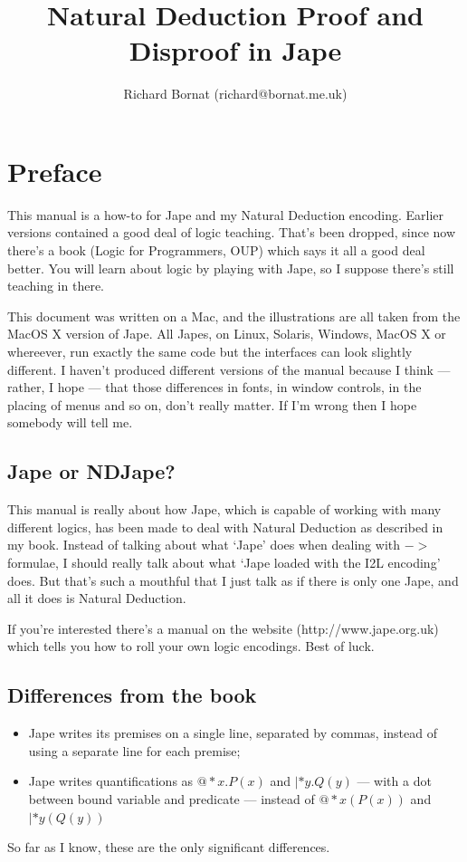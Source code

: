 \documentclass[11pt]{book}
\title{\huge Natural Deduction Proof and Disproof in Jape}
\author{Richard Bornat (richard@bornat.me.uk)}
\begin{document}
\maketitle


\chapter*{Preface}

This manual is a how-to for Jape and my Natural Deduction encoding. Earlier versions contained a good deal of logic teaching. That's been dropped, since now there's a book (Logic for Programmers, OUP) which says it all a good deal better. You will learn about logic by playing with Jape, so I suppose there's still teaching in there.

This document was written on a Mac, and the illustrations are all taken from the MacOS X version of Jape. All Japes, on Linux, Solaris, Windows, MacOS X or whereever, run exactly the same code but the interfaces can look slightly different. I haven't produced different versions of the manual because I think --- rather, I hope --- that those differences in fonts, in window controls, in the placing of menus and so on, don't really matter. If I'm wrong then I hope somebody will tell me.

\section*{Jape or NDJape?}

This manual is really about how Jape, which is capable of working with many different logics, has been made to deal with Natural Deduction as described in my book. Instead of talking about what `Jape' does when dealing with $->$ formulae, I should really talk about what `Jape loaded with the I2L encoding' does. But that's such a mouthful that I just talk as if there is only one Jape, and all it does is Natural Deduction.

If you're interested there's a manual on the website (http://www.jape.org.uk) which tells you how to roll your own logic encodings. Best of luck.

\section*{Differences from the book}
\begin{itemize}
\item Jape writes its premises on a single line, separated by commas, instead of using a separate line for each premise;
\item Jape writes quantifications as $@*x.P(x)$ and $|*y.Q(y)$ --- with a dot between bound variable and predicate --- instead of $@*x(P(x))$ and $|*y(Q(y))$
\end{itemize}
So far as I know, these are the only significant differences.
\end{document}
